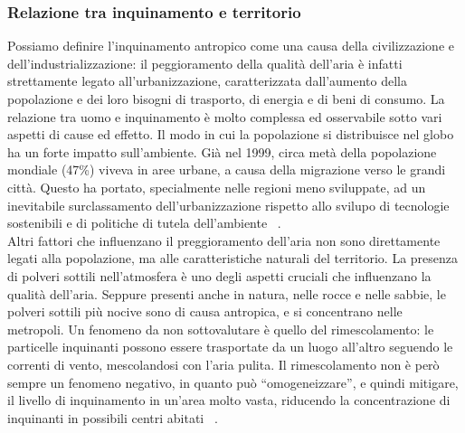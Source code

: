 \subsubsection{Relazione tra inquinamento e territorio}
Possiamo definire l'inquinamento antropico come una causa della civilizzazione e dell'industrializzazione: il peggioramento della qualità dell'aria è infatti strettamente legato all'urbanizzazione, caratterizzata dall'aumento della popolazione e dei loro bisogni di trasporto, di energia e di beni di consumo.
La relazione tra uomo e inquinamento è molto complessa ed osservabile sotto vari aspetti di cause ed effetto.
Il modo in cui la popolazione si distribuisce nel globo ha un forte impatto sull'ambiente.
Già nel 1999, circa metà della popolazione mondiale (47\%) viveva in aree urbane, a causa della migrazione verso le grandi città.
Questo ha portato, specialmente nelle regioni meno sviluppate, ad un inevitabile surclassamento dell'urbanizzazione rispetto allo svilupo di tecnologie sostenibili e di politiche di tutela dell'ambiente ~\cite{population_and_enviroment}.
\\
Altri fattori che influenzano il preggioramento dell'aria non sono direttamente legati alla popolazione, ma alle caratteristiche naturali del territorio.
La presenza di polveri sottili nell'atmosfera è uno degli aspetti cruciali che influenzano la qualità dell'aria.
Seppure presenti anche in natura, nelle rocce e nelle sabbie, le polveri sottili più nocive sono di causa antropica, e si concentrano nelle metropoli.
Un fenomeno da non sottovalutare è quello del rimescolamento: le particelle inquinanti possono essere trasportate da un luogo all'altro seguendo le correnti di vento, mescolandosi con l'aria pulita.
Il rimescolamento non è però sempre un fenomeno negativo, in quanto può “omogeneizzare”, e quindi mitigare, il livello di inquinamento in un'area molto vasta, riducendo la concentrazione di inquinanti in possibili centri abitati ~\cite{la_mincrometrologia}.

